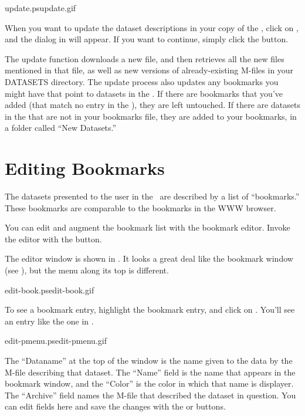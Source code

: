 {update.ps}{update.gif}{}

When you want to update the dataset descriptions in your copy of the
\GUI, click on , and the dialog in
 will appear.  If you want to continue,
simply click the  button.

The update function downloads a new  file, and then
retrieves all the new files mentioned in that file, as well as new
versions of already-existing M-files in your DATASETS directory.  The
update process also updates any bookmarks you might have that point to
datasets in the .  If there are bookmarks that you've
added (that match no entry in the ), they are left
untouched.  If there are datasets in the  that are not
in your bookmarks file, they are added to your bookmarks, in a folder
called ``New Datasets.''

\section{Editing Bookmarks}
\label{gui,intro,editbook}

The \opendap datasets presented to the user in the \GUI\ are described by
a list of ``bookmarks.'' These bookmarks are comparable to the
bookmarks in the  WWW browser.

You can edit and augment the bookmark list with the bookmark editor.
Invoke the editor with the  button.

The editor window is shown in .  It looks
a great deal like the bookmark window (see
), but the menu along its top is
different.

%
{edit-book.ps}{edit-book.gif}{}

To see a bookmark entry, highlight the bookmark entry, and click on
.   You'll see an entry like the one in
. 

%
{edit-pmenu.ps}{edit-pmenu.gif}{}

The ``Dataname'' at the top of the window is the name given to the
data by the M-file describing that dataset.  The ``Name'' field is the
name that appears in the bookmark window, and the ``Color'' is the
color in which that name is displayer.  The ``Archive'' field names
the M-file that described the dataset in question.  You can edit fields
here and save the changes with the  or  buttons.

